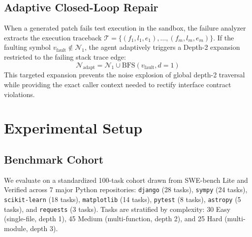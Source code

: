 \documentclass[10pt,twocolumn,letterpaper]{article}
\begin{document}
\subsection{Adaptive Closed-Loop Repair}
When a generated patch fails test execution in the sandbox, the failure analyzer extracts the execution traceback $\mathcal{T} = \{(f_1, l_1, e_1), \dots, (f_m, l_m, e_m)\}$. If the faulting symbol $v_{\text{fault}} \notin \mathcal{N}_1$, the agent adaptively triggers a Depth-2 expansion restricted to the failing stack trace edge:
\begin{equation}
\mathcal{N}_{\text{adapt}} = \mathcal{N}_1 \cup \text{BFS}(v_{\text{fault}}, d=1)
\end{equation}
This targeted expansion prevents the noise explosion of global depth-2 traversal while providing the exact caller context needed to rectify interface contract violations.

\section{Experimental Setup}
\subsection{Benchmark Cohort}
We evaluate on a standardized 100-task cohort drawn from SWE-bench Lite and Verified across 7 major Python repositories: \texttt{django} (28 tasks), \texttt{sympy} (24 tasks), \texttt{scikit-learn} (18 tasks), \texttt{matplotlib} (14 tasks), \texttt{pytest} (8 tasks), \texttt{astropy} (5 tasks), and \texttt{requests} (3 tasks). Tasks are stratified by complexity: 30 Easy (single-file, depth 1), 45 Medium (multi-function, depth 2), and 25 Hard (multi-module, depth 3).
\end{document}
